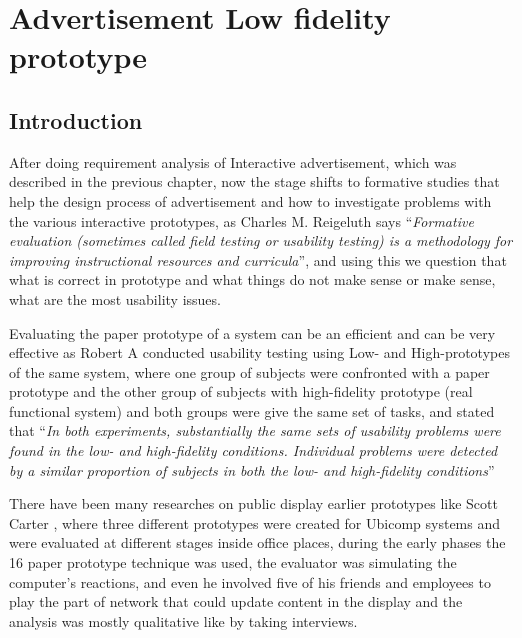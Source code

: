 \chapter{Advertisement Low fidelity prototype} %

\label{Chapter5} %

\section{Introduction}



After doing requirement analysis of Interactive advertisement, which was described in the previous chapter, now the stage shifts to formative studies that help the design process of advertisement and how to investigate problems with the various interactive prototypes, as Charles M. Reigeluth \cite{formativestudy} says ``\emph{Formative evaluation (sometimes called field testing or usability testing) is a methodology for improving instructional resources and curricula}'', and using this we question that what is correct in prototype and what things do not make sense or make sense, what are the most usability issues.


Evaluating the paper prototype of a system can be an efficient \cite{lowfidelityefficient} and can be very effective as Robert A \cite{usabilityproblems} conducted usability testing using Low- and High-prototypes of the same system, where one group of subjects were confronted with a paper prototype and the other group of subjects with high-fidelity prototype (real functional system) and both groups were give the same set of tasks, and stated that ``\emph{In both experiments, substantially the same sets of usability problems were found in the low- and high-fidelity conditions. Individual problems were detected by a similar proportion of subjects in both the low- and high-fidelity conditions}''


There have been many researches on public display earlier prototypes like Scott Carter \cite{prototypetesting1}, where three different prototypes were created for Ubicomp systems and were evaluated at different stages inside office places, during the early phases the 16 paper prototype technique was used, the evaluator was simulating the computer’s reactions, and even he involved five of his friends and employees to play the part of network that could update content in the display and the analysis was mostly qualitative like by taking interviews. 


